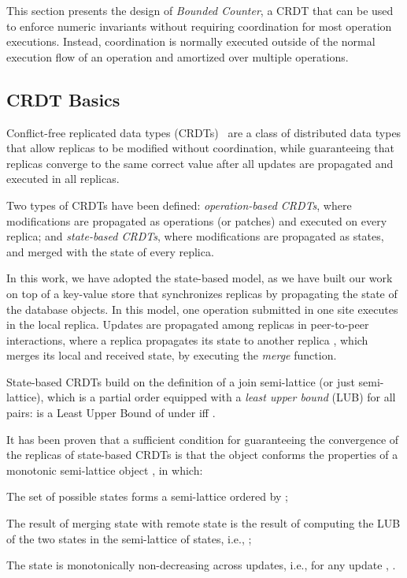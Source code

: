 \documentclass[conference]{IEEEtran}
\newcommand{\InvCounter}{\emph{Bounded Counter}}
\begin{document}
This section presents the design of \InvCounter{}, a CRDT that can be used to enforce numeric invariants without requiring coordination for most operation executions. Instead, coordination is normally executed outside of the normal execution flow of an operation and amortized over multiple operations.









\subsection{CRDT Basics}

Conflict-free replicated data types (CRDTs)~\cite{crdts} are a class of distributed data
types that allow replicas to be modified without coordination, while
guaranteeing that replicas converge to the same correct value after
all updates are propagated and executed in all replicas.  

Two types of CRDTs have been defined: \emph{operation-based CRDTs},
where modifications are propagated as operations (or patches) and executed on every
replica; and \emph{state-based CRDTs}, where modifications are
propagated as states, and merged with the state of every replica.

In this work, we have adopted the state-based model, as we have built our 
work on top of a key-value store that synchronizes replicas by propagating the 
state of the database objects. In this model,
one operation submitted in one site executes in the local replica.
Updates are propagated among replicas 
in peer-to-peer interactions, where a replica  propagates its state 
to another replica , which merges its local and received state, 
by executing the \emph{merge} function.

State-based CRDTs build on the definition of 
a join semi-lattice (or just semi-lattice), which is a
partial order  equipped with a \emph{least upper bound} (LUB)
 for all pairs:
   is a Least Upper Bound of
   under  iff 
.

It has been proven that a sufficient condition for guaranteeing the convergence 
of the replicas of state-based CRDTs is that the object conforms the properties of 
a monotonic semi-lattice object \cite{crdts}, in which:
\begin{inparaenum}[\em (i)]
\item 
  The set  of possible states forms a semi-lattice ordered by \SLleq;
\item
  The result of merging state  with remote state  is the result of
  computing the LUB of the two
  states in the semi-lattice of states, i.e., ;
\item
  The state is monotonically non-decreasing across updates, i.e., for any update
  , .
\end{inparaenum}
\end{document}
